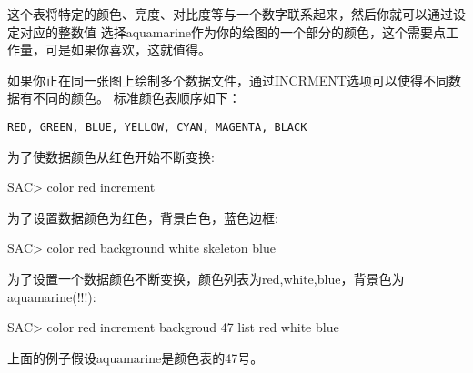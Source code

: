 这个表将特定的颜色、亮度、对比度等与一个数字联系起来，然后你就可以通过设定对应的整数值
选择aquamarine作为你的绘图的一个部分的颜色，这个需要点工作量，可是如果你喜欢，这就值得。

如果你正在同一张图上绘制多个数据文件，通过INCRMENT选项可以使得不同数据有不同的颜色。
标准颜色表顺序如下：
\begin{lstlisting}[style=Shell]
RED, GREEN, BLUE, YELLOW, CYAN, MAGENTA, BLACK
\end{lstlisting}

为了使数据颜色从红色开始不断变换:
\begin{SACCode}
SAC> color red increment
\end{SACCode}

为了设置数据颜色为红色，背景白色，蓝色边框:
\begin{SACCode}
SAC> color red background white skeleton blue
\end{SACCode}

为了设置一个数据颜色不断变换，颜色列表为red,white,blue，背景色为aquamarine(!!!):
\begin{SACCode}
SAC> color red increment backgroud 47 list red white blue
\end{SACCode}
上面的例子假设aquamarine是颜色表的47号。
